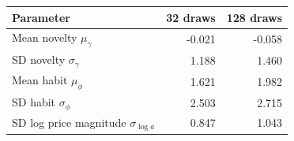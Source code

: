 \begin{tabular}{lrr}\toprule
Parameter & 32 draws & 128 draws\\\midrule
Mean novelty $\mu_\gamma$ & -0.021 & -0.058 \\
SD novelty $\sigma_\gamma$ & 1.188 & 1.460 \\
Mean habit $\mu_\phi$ & 1.621 & 1.982 \\
SD habit $\sigma_\phi$ & 2.503 & 2.715 \\
SD log price magnitude $\sigma_{\log a}$ & 0.847 & 1.043 \\
\bottomrule\end{tabular}
